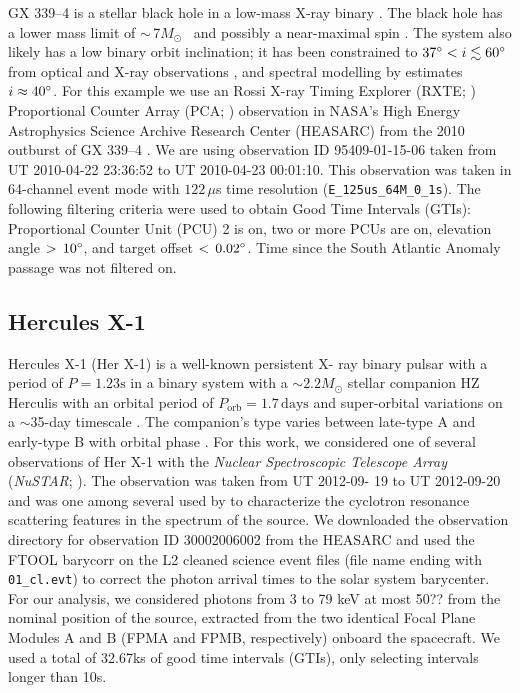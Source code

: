 \documentclass[twocolumn]{aastex62}
\newcommand{\project}[1]{\textsl{#1}\xspace}
\newcommand{\nustar}{\project{NuSTAR}\xspace}
\newcommand{\Msun}{\ensuremath{M_\odot}\xspace}
\begin{document}
GX 339--4 is a stellar black hole in a low-mass X-ray binary \citep{Hynesetal03}. 
The black hole has a lower mass limit of $\sim$\,7\Msun\ \citep{MunozDariasetal08} and possibly a near-maximal spin \citep{Ludlametal15}. 
The system also likely has a low binary orbit inclination; it has been constrained to $37 \degree <i\lesssim 60\degree$ from optical and X-ray observations \citep{Heidaetal17, Zdziarskietal98}, and spectral modelling by \citet{WangJietal18} estimates $i\approx 40\degree$.
For this example we use an Rossi X-ray Timing Explorer (RXTE; \citealt{Bradtetal93}) Proportional Counter Array (PCA; \citealt{Jahodaetal96}) observation in NASA's High Energy Astrophysics Science Archive Research Center (HEASARC) from the 2010 outburst of GX 339--4 \citep{Yamaokaetal10}.
We are using observation ID 95409-01-15-06 taken from UT 2010-04-22 23:36:52 to UT 2010-04-23 00:01:10.
This observation was taken in 64-channel event mode with $122\,\mu$s time resolution (\texttt{E\_125us\_64M\_0\_1s}).
The following filtering criteria were used to obtain Good Time Intervals (GTIs): Proportional Counter Unit (PCU) 2 is on, two or more PCUs are on, elevation angle $>\,10\degree$, and target offset $<\,0.02\degree$. 
Time since the South Atlantic Anomaly passage was not filtered on. 

\subsection{Hercules X-1}
\label{sec:herx1}

Hercules X-1 (Her X-1) is a well-known persistent X- ray binary pulsar with a period of $P = 1.23 \mathrm{s}$ \citep{tananbaum1972} in a binary system with a $\sim 2.2 M_\odot$ stellar companion HZ Herculis \citep{davidsen1972,forman1972,bahcall1972,reynolds1997,leahy2014} with an orbital period of $P_\mathrm{orb}=1.7\,\mathrm{days}$ and super-orbital variations on a $\sim$35-day timescale \citep{giacconi1973,scott1999,igna2011}. The companion's type varies between late-type A and early-type B with orbital phase \citep{anderson1994,cheng1995}. 
For this work, we considered one of several observations of Her X-1 with the \textit{Nuclear Spectroscopic Telescope Array} (\nustar; \citealt{nustar13}). The observation was taken from UT 2012-09- 19 to UT 2012-09-20 and was one among several used by \citep{Fuerst13} to characterize the cyclotron resonance scattering features in the spectrum of the source. We downloaded the observation directory for observation ID 30002006002 from the HEASARC and used the FTOOL barycorr on the L2 cleaned science event files (file name ending with \verb|01_cl.evt|) to correct the photon arrival times to the solar system barycenter. For our analysis, we considered photons from 3 to 79 keV at most 50?? from the nominal position of the source, extracted from the two identical Focal Plane Modules A and B (FPMA and FPMB, respectively) onboard the spacecraft. We used a total of 32.67ks of good time intervals (GTIs), only selecting intervals longer than 10s. 
\end{document}
